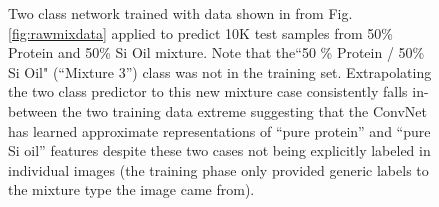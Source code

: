 \documentclass[%
reprint,
superscriptaddress,
 aps,
 pre,
]{revtex4-1}
\begin{document}
\begin{figure} [htb]  %
    \center
    \def\pw{1.}
    \begin{minipage}[b]{.99\linewidth} %
    \end{minipage}
    \caption{\footnotesize  Two class network trained with data shown in from Fig. \ref{fig:rawmixdata} applied to predict 10K test samples from 50\% Protein and 50\% Si Oil mixture.  Note that the``50 \% Protein / 50\% Si Oil" (``Mixture 3'') class was not in the training set.  Extrapolating the two class predictor to this new mixture case consistently falls in-between the two training data extreme suggesting that the ConvNet has learned approximate representations of ``pure protein'' and ``pure Si oil'' features despite these two cases not being explicitly labeled in individual images (the training phase only provided generic labels to the mixture type the image came from).  }
      \label{fig:mixpredict5050}
\end{figure}
\end{document}
